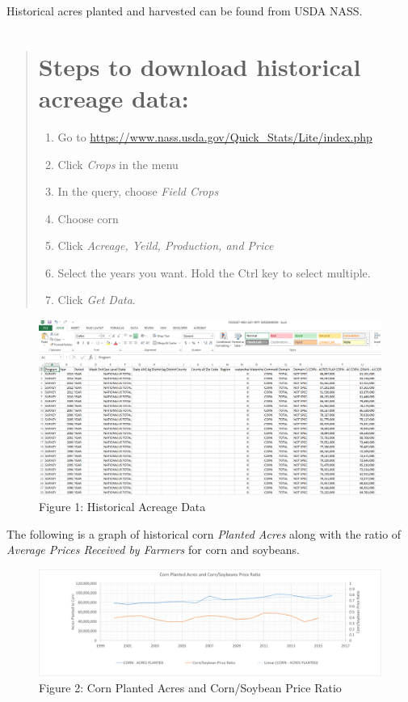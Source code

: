 \documentclass[]{book}
\providecommand{\tightlist}{%
  \setlength{\itemsep}{0pt}\setlength{\parskip}{0pt}}
\theoremstyle{definition}
\theoremstyle{definition}
\theoremstyle{remark}
\begin{document}
Historical acres planted and harvested can be found from USDA NASS.

\begin{quote}
\section{Steps to download historical acreage
data:}\label{steps-to-download-historical-acreage-data}

\begin{enumerate}
\def\labelenumi{\arabic{enumi}.}
\tightlist
\item
  Go to \url{https://www.nass.usda.gov/Quick_Stats/Lite/index.php}
\item
  Click \emph{Crops} in the menu
\item
  In the query, choose \emph{Field Crops}
\item
  Choose corn
\item
  Click \emph{Acreage, Yeild, Production, and Price}
\item
  Select the years you want. Hold the Ctrl key to select multiple.
\item
  Click \emph{Get Data}.
\end{enumerate}
\end{quote}

\begin{figure}[htbp]
\centering
\includegraphics{images/ACRES_historical.png}
\caption{Figure 1: Historical Acreage Data}
\end{figure}

The following is a graph of historical corn \emph{Planted Acres} along
with the ratio of \emph{Average Prices Received by Farmers} for corn and
soybeans.

\begin{figure}[htbp]
\centering
\includegraphics{Excel-files/ForecastingProduction-HistoricalAcreage_files/image003.png}
\caption{Figure 2: Corn Planted Acres and Corn/Soybean Price Ratio}
\end{figure}
\end{document}
